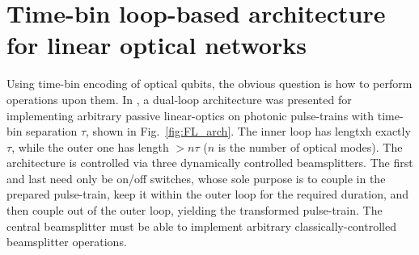 \documentclass[times,final]{elsarticle}
\begin{document}
\section{Time-bin loop-based architecture for linear optical networks}\label{sec:timebins}

Using time-bin encoding of optical qubits, the obvious question is how to perform operations upon them. In \cite{bib:Motes14}, a dual-loop architecture was presented for implementing arbitrary passive linear-optics on photonic pulse-trains with time-bin separation $\tau$, shown in Fig.~\ref{fig:FL_arch}. The inner loop has lengtxh exactly $\tau$, while the outer one has length $>n\tau$ ($n$ is the 
number of optical modes). The architecture is controlled via three 
dynamically controlled beamsplitters. The first and last need only be on/off switches, whose sole purpose is to couple in the prepared pulse-train, 
keep it within the outer loop for the required duration, and then couple 
out of the outer loop, yielding the transformed pulse-train. The central 
beamsplitter must be able to implement arbitrary classically-controlled 
beamsplitter operations.
\end{document}
